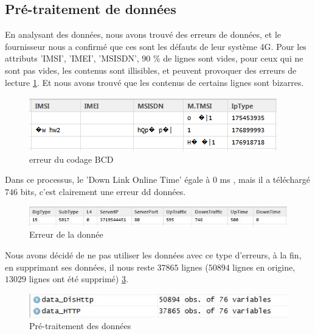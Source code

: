 \subsection{Pré-traitement de données}
En analysant des données, nous avons trouvé des erreurs de données, et le fournisseur nous a confirmé que ces sont les défauts de leur système 4G. Pour les attributs 'IMSI', 'IMEI', 'MSISDN', $90$ \% de lignes sont vides, pour ceux qui ne sont pas vides, les contenus sont illisibles, et peuvent provoquer des erreurs de lecture \ref{fig:errorData}. Et nous avons trouvé que les contenus de certains lignes sont bizarres. 
\begin{figure}[H]
	\centering
	\includegraphics[width=0.7\linewidth]{images/errorData}
	\caption{erreur du codage BCD}
	\label{fig:errorData}
\end{figure}
Dans ce processus, le 'Down Link Online Time' égale à  $0$ ms , mais il a téléchargé $746$ bits, c'est clairement une erreur dd données.
\begin{figure}[H]
	\centering
	\includegraphics[width=0.9\linewidth]{images/bizarre}
	\caption{Erreur de la donnée}
	\label{fig:bizarre}
\end{figure}

 Nous avons décidé de ne pas utiliser les données avec ce type d'erreurs, à la fin, en supprimant ses données, il nous reste $37865$ lignes ($50894$ lignes en origine, $13029$ lignes ont été supprimé)  \ref{fig:newdata}.
 
\begin{figure}[H]
	\centering
	\includegraphics[width=0.8\linewidth]{images/newdata}
	\caption{Pré-traitement des données}
	\label{fig:newdata}
\end{figure}

